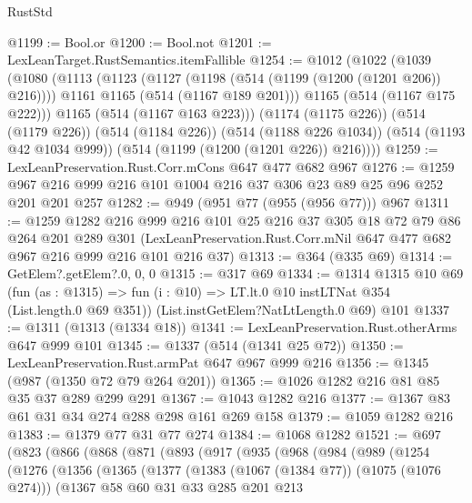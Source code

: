 \begin{lexlean}{RustStd}
\begin{coremodule}
@1199 := Bool.or
@1200 := Bool.not
@1201 := LexLeanTarget.RustSemantics.itemFallible
@1254 := @1012
    (@1022
      (@1039
        (@1080
          (@1113
            (@1123
              (@1127 (@1198 (@514 (@1199 (@1200 (@1201 @206)) @216))))
              @1161
              @1165
              (@514 (@1167 @189 @201)))
            @1165
            (@514 (@1167 @175 @222)))
          @1165
          (@514 (@1167 @163 @223)))
        (@1174 (@1175 @226))
        (@514 (@1179 @226))
        (@514 (@1184 @226))
        (@514 (@1188 @226 @1034))
        (@514 (@1193 @42 @1034 @999))
        (@514 (@1199 (@1200 (@1201 @226)) @216))))
@1259 := LexLeanPreservation.Rust.Corr.mCons @647 @477 @682 @967
@1276 := @1259 @967 @216 @999 @216 @101 @1004 @216 @37 @306 @23 @89 @25 @96 @252 @201 @201 @257
@1282 := @949 (@951 @77 (@955 (@956 @77))) @967
@1311 := @1259
    @1282
    @216
    @999
    @216
    @101
    @25
    @216
    @37
    @305
    @18
    @72
    @79
    @86
    @264
    @201
    @289
    @301
    (LexLeanPreservation.Rust.Corr.mNil @647 @477 @682 @967 @216 @999 @216 @101 @216 @37)
@1313 := @364 (@335 @69)
@1314 := GetElem?.getElem?.{0, 0, 0}
@1315 := @317 @69
@1334 := @1314
    @1315
    @10
    @69
    (fun (as : @1315) => fun (i : @10) => LT.lt.{0} @10 instLTNat @354 (List.length.{0} @69 @351))
    (List.instGetElem?NatLtLength.{0} @69)
    @101
@1337 := @1311 (@1313 (@1334 @18))
@1341 := LexLeanPreservation.Rust.otherArms @647 @999 @101
@1345 := @1337 (@514 (@1341 @25 @72))
@1350 := LexLeanPreservation.Rust.armPat @647 @967 @999 @216
@1356 := @1345 (@987 (@1350 @72 @79 @264 @201))
@1365 := @1026 @1282 @216 @81 @85 @35 @37 @289 @299 @291
@1367 := @1043 @1282 @216
@1377 := @1367 @83 @61 @31 @34 @274 @288 @298 @161 @269 @158
@1379 := @1059 @1282 @216
@1383 := @1379 @77 @31 @77 @274
@1384 := @1068 @1282
@1521 := @697
    (@823
      (@866
        (@868
          (@871
            (@893
              (@917
                (@935
                  (@968
                    (@984
                      (@989
                        (@1254
                          (@1276
                            (@1356
                              (@1365
                                (@1377
                                  (@1383 (@1067 (@1384 @77)) (@1075 (@1076 @274)))
                                  (@1367
                                    @58
                                    @60
                                    @31
                                    @33
                                    @285
                                    @201
                                    @213

\end{coremodule}
\end{lexlean}
